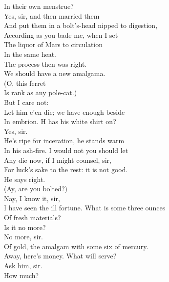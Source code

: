 \documentclass[a4paper,oneside,12pt]{memoir}
\begin{document}
\begin{drama*}
In their own menstrue?\\
\facespeaks {} Yes, sir, and then married them\\
And put them in a bolt's-head nipped to digestion,\\
According as you bade me, when I set\\
The liquor of Mars to circulation\\
In the same heat.\\
\subtlespeaks {} The process then was right.\\
We should have a new amalgama.\\
\surlyspeaks {} (O, this ferret\\
Is rank as any pole-cat.)\\
\subtlespeaks {} But I care not:\\
Let him e'en die; we have enough beside\\
In embrion. H has his white shirt on?\\
\facespeaks {} Yes, sir.\\
He's ripe for inceration, he stands warm\\
In his ash-fire. I would not you should let\\
Any die now, if I might counsel, sir,\\
For luck's sake to the rest: it is not good.\\
\mammonspeaks He says right.\\
\surlyspeaks {} (Ay, are you bolted?)\\
\facespeaks {} Nay, I know it, sir,\\
I have seen the ill fortune. What is some three ounces\\
Of fresh materials?\\
\mammonspeaks {} Is it no more?\\
\facespeaks {} No more, sir.\\
Of gold, the amalgam with some six of mercury.\\
\mammonspeaks Away, here's money. What will serve?\\
\facespeaks {} Ask him, sir.\\
\mammonspeaks How much?\\

\end{drama*}
\end{document}
